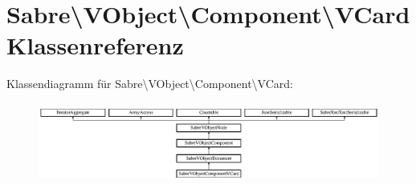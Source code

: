 \hypertarget{class_sabre_1_1_v_object_1_1_component_1_1_v_card}{}\section{Sabre\textbackslash{}V\+Object\textbackslash{}Component\textbackslash{}V\+Card Klassenreferenz}
\label{class_sabre_1_1_v_object_1_1_component_1_1_v_card}
Klassendiagramm für Sabre\textbackslash{}V\+Object\textbackslash{}Component\textbackslash{}V\+Card\+:\begin{figure}[H]
\begin{center}
\leavevmode
\includegraphics[height=2.641510cm]{class_sabre_1_1_v_object_1_1_component_1_1_v_card}
\end{center}
\end{figure}
